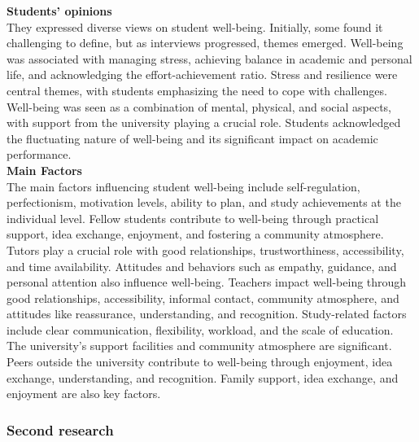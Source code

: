 \documentclass[11pt]{report}
\begin{document}
\textbf{Students' opinions} \\
They expressed diverse views on student well-being. Initially, some found it challenging to define, but as interviews progressed, themes emerged. Well-being was associated with managing stress, achieving balance in academic and personal life, and acknowledging the effort-achievement ratio. Stress and resilience were central themes, with students emphasizing the need to cope with challenges. Well-being was seen as a combination of mental, physical, and social aspects, with support from the university playing a crucial role. Students acknowledged the fluctuating nature of well-being and its significant impact on academic performance.\vspace{5mm} \\
\textbf{Main Factors} \\
The main factors influencing student well-being include self-regulation, perfectionism, motivation levels, ability to plan, and study achievements at the individual level. Fellow students contribute to well-being through practical support, idea exchange, enjoyment, and fostering a community atmosphere. Tutors play a crucial role with good relationships, trustworthiness, accessibility, and time availability. Attitudes and behaviors such as empathy, guidance, and personal attention also influence well-being. Teachers impact well-being through good relationships, accessibility, informal contact, community atmosphere, and attitudes like reassurance, understanding, and recognition. Study-related factors include clear communication, flexibility, workload, and the scale of education. The university's support facilities and community atmosphere are significant. Peers outside the university contribute to well-being through enjoyment, idea exchange, understanding, and recognition. Family support, idea exchange, and enjoyment are also key factors.

\subsubsection{Second research}
\end{document}
